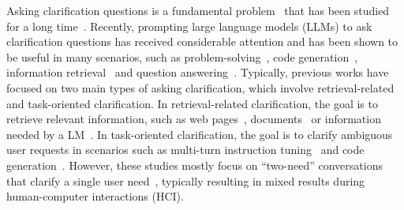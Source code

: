 \documentclass{article} %
\theoremstyle{definition}
\begin{document}
\label{sec:introduction}
Asking clarification questions is a fundamental problem~\citep{clarify_survey,proactive_survey} that has been studied for a long time~\citep{clarify_question_for_retrieval}.
Recently, prompting large language models (LLMs) to ask clarification questions has received considerable attention and has been shown to be useful in many scenarios, such as problem-solving~\citep{proactive_cot}, code generation~\citep{clarifygpt}, information retrieval~\citep{clarinet} and question answering~\citep{inscit,star_gate,learn_to_clarify}.
Typically, previous works have focused on two main types of asking clarification, which involve retrieval-related and task-oriented clarification.
In retrieval-related clarification, the goal is to retrieve relevant information, such as web pages~\citep{clarinet}, documents~\citep{multiturn_clarification} or information needed by a LM~\citep{inscit,star_gate,learn_to_clarify}.
In task-oriented clarification, the goal is to clarify ambiguous user requests in scenarios such as multi-turn instruction tuning~\citep{proactive_cot} and code generation~\citep{clarifygpt}.
However, these studies mostly focus on ``two-need'' conversations that clarify a single user need~\citep{selective,abg_coqa,mixed_initiative_dialogue}, typically resulting in mixed results during human-computer interactions (HCI).
\end{document}
